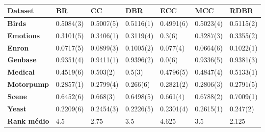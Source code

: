 \begin{table}[\tabmode]
\begin{tabular}{lllllll}
\hline
\textbf{Dataset}    & \textbf{BR} & \textbf{CC} & \textbf{DBR} & \textbf{ECC} & \textbf{MCC} & \textbf{RDBR} \\ \hline
\textbf{Birds}      & 0.5084(3)   & 0.5007(5)   & 0.5116(1)    & 0.4991(6)    & 0.5023(4)    & 0.5115(2)     \\
\textbf{Emotions}   & 0.3101(5)   & 0.3406(1)   & 0.3119(4)    & 0.3(6)       & 0.3287(3)    & 0.3355(2)     \\
\textbf{Enron}      & 0.0717(5)   & 0.0899(3)   & 0.1005(2)    & 0.077(4)     & 0.0664(6)    & 0.1022(1)     \\
\textbf{Genbase}    & 0.9351(4)   & 0.9411(1)   & 0.9396(2)    & 0.0(6)       & 0.9336(5)    & 0.9381(3)     \\
\textbf{Medical}    & 0.4519(6)   & 0.503(2)    & 0.5(3)       & 0.4796(5)    & 0.4847(4)    & 0.5133(1)     \\
\textbf{Motorpump}  & 0.2857(1)   & 0.2799(4)   & 0.266(6)     & 0.2821(2)    & 0.2806(3)    & 0.2791(5)     \\
\textbf{Scene}      & 0.6452(6)   & 0.668(3)    & 0.6498(5)    & 0.661(4)     & 0.6788(2)    & 0.7009(1)     \\
\textbf{Yeast}      & 0.2209(6)   & 0.2454(3)   & 0.2226(5)    & 0.2301(4)    & 0.2615(1)    & 0.247(2)      \\ \hline
\textbf{Rank médio} & 4.5         & 2.75        & 3.5          & 4.625        & 3.5          & 2.125         \\ \hline
\end{tabular}
\caption{}
\label{tab:SAknn}
\end{table}